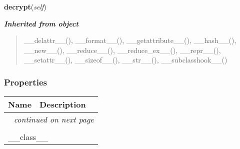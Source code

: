    \vspace{0.5ex}

\hspace{.8\funcindent}\begin{boxedminipage}{\funcwidth}

    \raggedright \textbf{decrypt}(\textit{self})

\setlength{\parskip}{2ex}
\setlength{\parskip}{1ex}
    \end{boxedminipage}


\large{\textbf{\textit{Inherited from object}}}

\begin{quote}
\_\_delattr\_\_(), \_\_format\_\_(), \_\_getattribute\_\_(), \_\_hash\_\_(), \_\_new\_\_(), \_\_reduce\_\_(), \_\_reduce\_ex\_\_(), \_\_repr\_\_(), \_\_setattr\_\_(), \_\_sizeof\_\_(), \_\_str\_\_(), \_\_subclasshook\_\_()
\end{quote}


  \subsubsection{Properties}

    \vspace{-1cm}
\hspace{\varindent}\begin{longtable}{|p{\varnamewidth}|p{\vardescrwidth}|l}
\cline{1-2}
\cline{1-2} \centering \textbf{Name} & \centering \textbf{Description}& \\
\cline{1-2}
\endhead\cline{1-2}\multicolumn{3}{r}{\small\textit{continued on next page}}\\\endfoot\cline{1-2}
\endlastfoot\multicolumn{2}{|l|}{\textit{Inherited from object}}\\
\multicolumn{2}{|p{\varwidth}|}{\raggedright \_\_class\_\_}\\
\cline{1-2}
\end{longtable}



